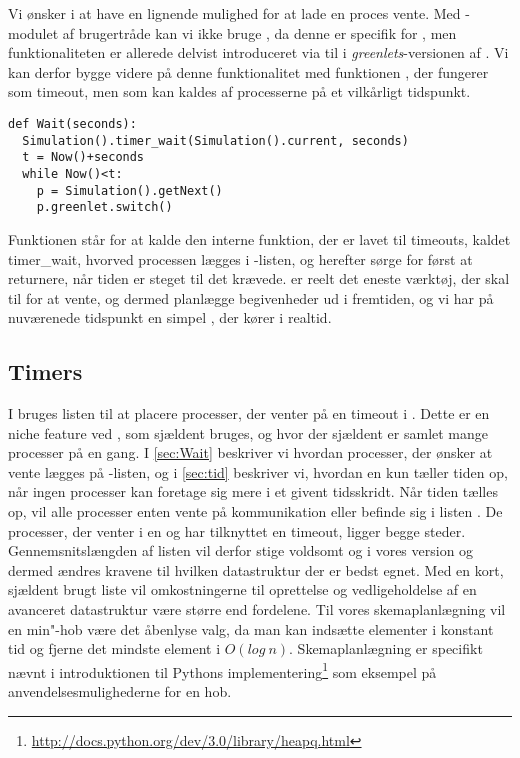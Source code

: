  Vi ønsker i \pycsp at have en lignende mulighed for at lade en proces vente. Med -modulet af brugertråde kan vi ikke bruge , da denne er specifik for , men funktionaliteten er allerede delvist introduceret via  til  i \emph{greenlets}-versionen af \pycsp. Vi kan derfor bygge videre på denne funktionalitet med funktionen , der fungerer som timeout, men som kan kaldes af processerne på et vilkårligt tidspunkt.

\begin{lstlisting}[firstnumber=20,float=hbtp, label=fig:wait, caption=Wait i \code{simulering}-versionen.] 
def Wait(seconds):
  Simulation().timer_wait(Simulation().current, seconds)
  t = Now()+seconds
  while Now()<t:
    p = Simulation().getNext() 
    p.greenlet.switch()
\end{lstlisting}

Funktionen  står for at kalde den interne funktion, der er lavet til timeouts, kaldet timer\_wait, hvorved processen lægges i -listen, og herefter sørge for først at returnere, når tiden er steget til det krævede.  er reelt det eneste værktøj, der skal til for at vente, og dermed planlægge begivenheder ud i fremtiden, og vi har på nuværenede tidspunkt en simpel \des, der kører i realtid. 

\subsection{Timers}  
I \pycsp bruges listen  til at placere processer, der venter på en timeout i . Dette er en niche feature ved \pycsp, som  sjældent bruges, og hvor der sjældent er samlet mange processer på en gang. 
I \cref{sec:Wait} beskriver vi hvordan processer, der ønsker at vente lægges på -listen, og i \cref{sec:tid} beskriver vi, hvordan \sched en kun tæller tiden op, når ingen processer kan foretage sig mere i et givent tidsskridt. Når tiden tælles op, vil  alle processer enten vente på kommunikation eller befinde sig i listen . De processer, der venter i en  og har tilknyttet en timeout, ligger begge steder. Gennemsnitslængden af listen vil derfor stige voldsomt og i vores version og dermed ændres kravene til hvilken  datastruktur der er bedst egnet. 
Med en kort, sjældent brugt liste vil omkostningerne til oprettelse og vedligeholdelse af en avanceret datastruktur være større end fordelene. Til vores skemaplanlægning  vil en min"-hob være det åbenlyse valg, da  man kan  indsætte elementer i konstant tid og fjerne det mindste element i $O(log\ n)$. Skemaplanlægning er specifikt nævnt i introduktionen til Pythons implementering\footnote{\url{http://docs.python.org/dev/3.0/library/heapq.html}} som eksempel på anvendelsesmulighederne for en hob. 

